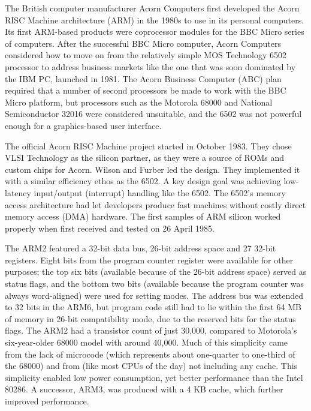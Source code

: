 \documentclass[12pt]{article}
\begin{document}
The British computer manufacturer Acorn Computers first developed the Acorn RISC Machine architecture (ARM) in the 1980s to use in its personal computers. Its first ARM-based products were coprocessor modules for the BBC Micro series of computers. After the successful BBC Micro computer, Acorn Computers considered how to move on from the relatively simple MOS Technology 6502 processor to address business markets like the one that was soon dominated by the IBM PC, launched in 1981. The Acorn Business Computer (ABC) plan required that a number of second processors be made to work with the BBC Micro platform, but processors such as the Motorola 68000 and National Semiconductor 32016 were considered unsuitable, and the 6502 was not powerful enough for a graphics-based user interface.\cite{wikipediaintro}\par

The official Acorn RISC Machine project started in October 1983. They chose VLSI Technology as the silicon partner, as they were a source of ROMs and custom chips for Acorn. Wilson and Furber led the design. They implemented it with a similar efficiency ethos as the 6502. A key design goal was achieving low-latency input/output (interrupt) handling like the 6502. The 6502's memory access architecture had let developers produce fast machines without costly direct memory access (DMA) hardware. The first samples of ARM silicon worked properly when first received and tested on 26 April 1985.\cite{wikipediaintro}\par

The ARM2 featured a 32-bit data bus, 26-bit address space and 27 32-bit registers. Eight bits from the program counter register were available for other purposes; the top six bits (available because of the 26-bit address space) served as status flags, and the bottom two bits (available because the program counter was always word-aligned) were used for setting modes. The address bus was extended to 32 bits in the ARM6, but program code still had to lie within the first 64 MB of memory in 26-bit compatibility mode, due to the reserved bits for the status flags. The ARM2 had a transistor count of just 30,000, compared to Motorola's six-year-older 68000 model with around 40,000. Much of this simplicity came from the lack of microcode (which represents about one-quarter to one-third of the 68000) and from (like most CPUs of the day) not including any cache. This simplicity enabled low power consumption, yet better performance than the Intel 80286. A successor, ARM3, was produced with a 4 KB cache, which further improved performance.\cite{wikipediaintro}\par
\end{document}
